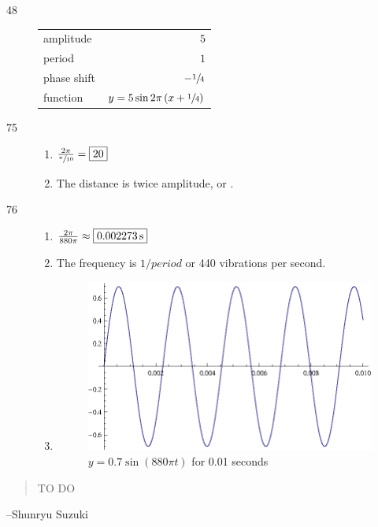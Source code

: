 \documentclass{exam}
\begin{document}
\begin{description}
    \item[48]
      \begin{tabular}[H]{lr}
        \toprule
        amplitude   & $5$ \\
        period      & $1$ \\
        phase shift & $- \sfrac{1}{4}$ \\
        function    & $y = 5 \sin 2 \pi \left( x + \sfrac{1}{4} \right)$ \\
        \bottomrule
      \end{tabular}

    \item[75]
      \begin{enumerate}[a]
        \item $\frac{2 \pi}{\sfrac{\pi}{10}} = \boxed{ 20 }$
        \item The distance is twice amplitude, or .
      \end{enumerate}

    \item[76]
      \begin{enumerate}[a]
        \item $\frac{2 \pi}{880 \pi} \approx \boxed{ \unit[ 0.002273 ]{s} }$
        \item The frequency is $1/period$ or 440 vibrations per second.

        \item
          \begin{figure}[H]
            \centering
            \includegraphics[scale=1.0]{exercise76.eps}
            \caption{$y = 0.7 \sin \left( 880 \pi t \right)$ for 0.01 seconds}
          \end{figure}

      \end{enumerate}

    \end{description}
  \else
    \vspace{1 cm}
    \begin{quote}
      \begin{em}
        TO DO
      \end{em}
    \end{quote}
    \hspace{1 cm} --Shunryu Suzuki
  \fi
\end{document}
